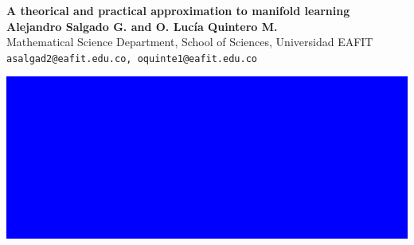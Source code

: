 \documentclass[a0,portrait]{a0poster}
\begin{document}
\begin{minipage}[b]{0.80\linewidth}
\VeryHuge \color{NavyBlue} \textbf{A theorical and practical approximation to manifold learning} \color{Black}\\[2.4cm] %
\huge \textbf{Alejandro Salgado G. and O. Luc\'ia Quintero M.}\\[0.5cm] %
\LARGE Mathematical Science Department, School of Sciences, Universidad EAFIT\\[0.4cm]
\Large \texttt{asalgad2@eafit.edu.co, oquinte1@eafit.edu.co}\\
\end{minipage}
%
\begin{minipage}[b]{0.2\linewidth}
\includegraphics[width=14cm]{figures/logo.png}\\
\end{minipage}
\end{document}
